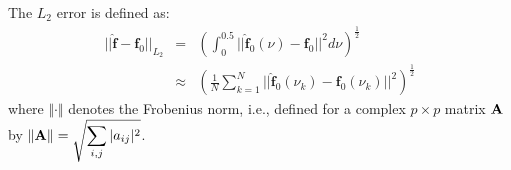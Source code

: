 \documentclass[%
 reprint,
 amsmath,amssymb,
 aps,
]{revtex4-2}
\begin{document}
The $L_2$ error is defined as:
\begin{eqnarray*}
||\hat{\bm{f}} - \bm{f}_0||_{L_2} &=& \left(\int_{0}^{0.5} ||\hat{\bm{f}}_0(\nu) - \bm{f}_0||^2 d\nu \right)^{\frac{1}{2}} \\
&\approx &\left(\frac{1}{N} \sum_{k=1}^{N}||\hat{\bm{f}}_0(\nu_k)-\bm{f}_0(\nu_k)||^2 \right)^{\frac{1}{2}}
\end{eqnarray*}
where $\Vert \cdot \Vert$ denotes the Frobenius norm, i.e., defined for a complex $p\times p$ matrix ${\bf A}$ by
$\displaystyle \Vert {\bf A}\Vert= \sqrt{\sum_{i,j} |a_{ij}|^2}$.
\end{document}
